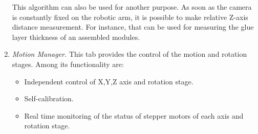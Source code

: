 \begin{enumerate}
This algorithm can also be used for another purpose. As soon as the camera is constantly fixed on the robotic arm, it is possible to make relative Z-axis distance measurement. For instance, that can be used for measuring the glue layer thickness of an assembled modules.

\item \emph{Motion Manager.} This tab provides the control of the motion and rotation stages. Among its functionality are:

\begin{itemize}
\setlength\itemsep{-0.5em}
\item Independent control of X,Y,Z axis and rotation stage.
\item Self-calibration.
\item Real time monitoring of the status of stepper motors of each axis and rotation stage.
\end{itemize}
\end{enumerate}


